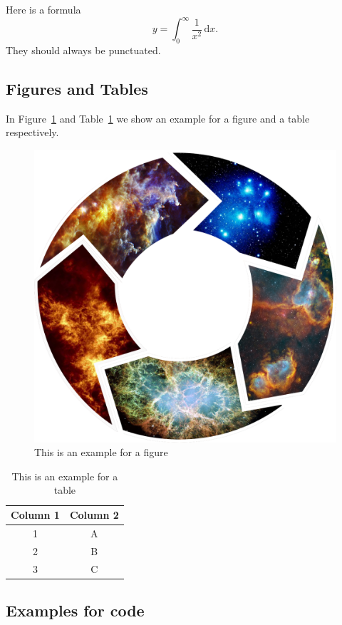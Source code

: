 \documentclass{phoebe}
\begin{document}
Here is a formula
\begin{equation}
    y = \int_0^\infty \frac{1}{x^2}\, \mathrm{d}x.
\end{equation}
They should always be punctuated. 

\subsection{Figures and Tables}

In Figure~\ref{fig:example} and Table~\ref{tab:example} we show an example for a figure and a table respectively. 
\begin{figure}
    \centering
    \includegraphics[width=0.8\columnwidth]{baryon_cycle}
    \caption{This is an example for a figure}
    \label{fig:example}
\end{figure}


\begin{table}
    \centering
    \caption{This is an example for a table}
    \begin{tabular}{cc}\toprule
        Column 1  & Column 2 \\\midrule
        1 & A \\
        2 & B \\
        3 & C \\\bottomrule
    \end{tabular}
    \label{tab:example}
\end{table}

\Blindtext

\subsection{Examples for code}
\end{document}
